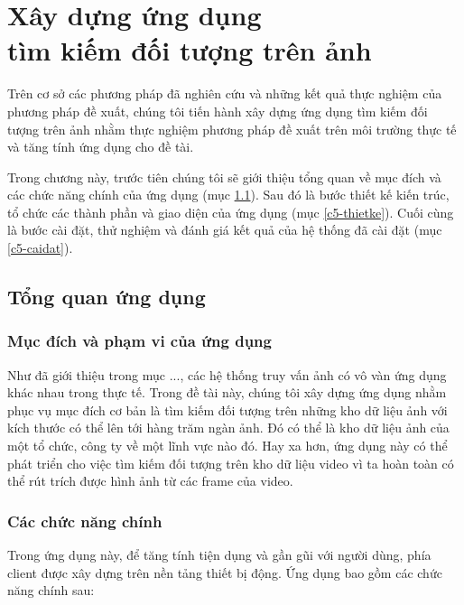 \chapter{Xây dựng ứng dụng\\tìm kiếm đối tượng trên ảnh}
\label{chapter:application}
\ifpdf
    \graphicspath{{Chapter5/Chapter5Figs/PNG/}{Chapter5/Chapter5Figs/PDF/}{Chapter5/Chapter5Figs/}}
\else
    \graphicspath{{Chapter5/Chapter5Figs/EPS/}{Chapter5/Chapter5Figs/}}
\fi
{}

Trên cơ sở các phương pháp đã nghiên cứu và những kết quả thực nghiệm của phương pháp đề xuất, chúng tôi tiến hành xây dựng ứng dụng tìm kiếm đối tượng trên ảnh nhằm thực nghiệm phương pháp đề xuất trên môi trường thực tế và tăng tính ứng dụng cho đề tài.

Trong chương này, trước tiên chúng tôi sẽ giới thiệu tổng quan về mục đích và các chức năng chính của ứng dụng (mục \ref{c5-tongquan}). Sau đó là bước thiết kế kiến trúc, tổ chức các thành phần và giao diện của ứng dụng (mục \ref{c5-thietke}). Cuối cùng là bước cài đặt, thử nghiệm và đánh giá kết quả của hệ thống đã cài đặt (mục \ref{c5-caidat}).

\section{Tổng quan ứng dụng}
\label{c5-tongquan}

	\subsection{Mục đích và phạm vi của ứng dụng}
Như đã giới thiệu trong mục ..., các hệ thống truy vấn ảnh có vô vàn ứng dụng khác nhau trong thực tế. Trong đề tài này, chúng tôi xây dựng ứng dụng nhằm phục vụ mục đích cơ bản là tìm kiếm đối tượng trên những kho dữ liệu ảnh với kích thước có thể lên tới hàng trăm ngàn ảnh. Đó có thể là kho dữ liệu ảnh của một tổ chức, công ty về một lĩnh vực nào đó. Hay xa hơn, ứng dụng này có thể phát triển cho việc tìm kiếm đối tượng trên kho dữ liệu video vì ta hoàn toàn có thể rút trích được hình ảnh từ các frame của video.
	
	\subsection{Các chức năng chính}
Trong ứng dụng này, để tăng tính tiện dụng và gần gũi với người dùng, phía client được xây dựng trên nền tảng thiết bị động. Ứng dụng bao gồm các chức năng chính sau:

